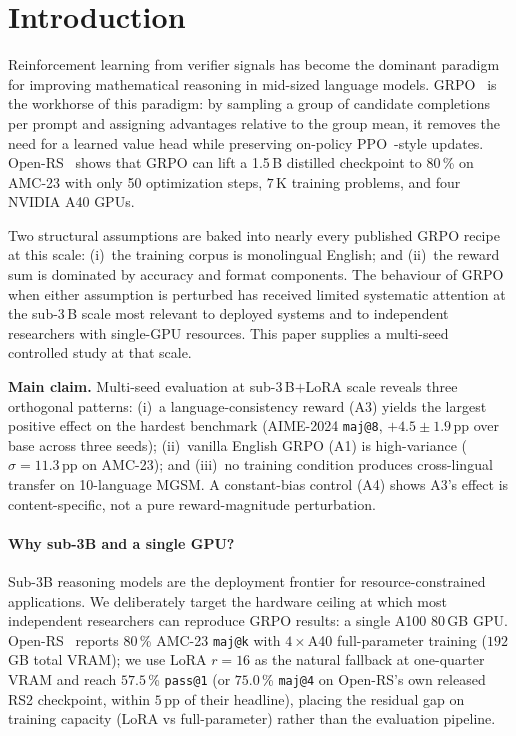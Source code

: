 \documentclass[11pt]{article}
\newcommand{\armA}{\textsc{A1}}
\newcommand{\armC}{\textsc{A3}}
\newcommand{\armD}{\textsc{A4}}
\newcommand{\boxedclaim}[1]{%
  \begin{tcolorbox}[colback=blue!4,colframe=blue!50!black,boxrule=0.5pt]%
  \small #1 \end{tcolorbox}}
\begin{document}
\section{Introduction}
\label{sec:intro}

Reinforcement learning from verifier signals has become the dominant
paradigm for improving mathematical reasoning in mid-sized language
models. GRPO~\cite{deepseekmath_2024,deepseekR1_2025} is the workhorse
of this paradigm: by sampling a group of candidate completions per
prompt and assigning advantages relative to the group mean, it removes
the need for a learned value head while preserving on-policy
PPO~\cite{schulman2017ppo}-style updates. Open-RS~\cite{openRS_2025}
shows that GRPO can lift a 1.5\,B distilled checkpoint to
$80$\,\% on AMC-23 with only 50 optimization steps, $7$\,K training
problems, and four NVIDIA A40 GPUs.

Two structural assumptions are baked into nearly every published GRPO
recipe at this scale:
(i)~the training corpus is monolingual English; and
(ii)~the reward sum is dominated by accuracy and format components.
The behaviour of GRPO when either assumption is perturbed has received
limited systematic attention at the sub-3\,B scale most relevant to
deployed systems and to independent researchers with single-GPU
resources. This paper supplies a multi-seed controlled study at that
scale.

\boxedclaim{%
\textbf{Main claim.} Multi-seed evaluation at sub-3\,B${+}$LoRA scale
reveals three orthogonal patterns: (i)~a language-consistency reward
(\armC{}) yields the largest positive effect on the hardest benchmark
(AIME-2024 \texttt{maj@8}, $+4.5 \pm 1.9$\,pp over base across three
seeds); (ii)~vanilla English GRPO (\armA{}) is high-variance
($\sigma{=}11.3$\,pp on AMC-23); and (iii)~no training condition
produces cross-lingual transfer on 10-language MGSM. A constant-bias
control (\armD{}) shows \armC{}'s effect is content-specific, not a
pure reward-magnitude perturbation.}

\paragraph{Why sub-3B and a single GPU?}
Sub-3B reasoning models are the deployment frontier for resource-constrained
applications. We deliberately target the hardware ceiling at which most
independent researchers can reproduce GRPO results: a single A100 80\,GB
GPU. Open-RS~\cite{openRS_2025} reports
$80$\,\% AMC-23 \texttt{maj@k} with $4{\times}$A40 full-parameter training
($192$\,GB total VRAM); we use LoRA $r{=}16$ as the natural fallback at
one-quarter VRAM and reach $57.5$\,\% \texttt{pass@1} (or $75.0$\,\%
\texttt{maj@4} on Open-RS's own released RS2 checkpoint, within $5$\,pp of
their headline), placing the residual gap on training capacity (LoRA vs
full-parameter) rather than the evaluation pipeline.
\end{document}

